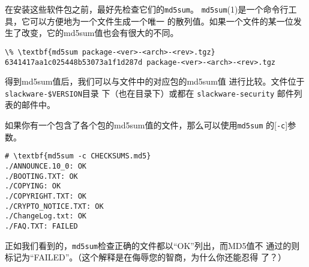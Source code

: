 在安装这些软件包之前，最好先检查它们的\texttt{md5sum}。
\texttt{md5sum}(1)是一个命令行工具，它可以方便地为一个文件生成一个唯一
的散列值。如果一个文件的某一位发生了改变，它的md5sum值也会有很大的不同。
\begin{Verbatim}[frame=single, commandchars=\\\{\}]
\% \textbf{md5sum package-<ver>-<arch>-<rev>.tgz}
6341417aa1c025448b53073a1f1d287d package-<ver>-<arch>-<rev>.tgz
\end{Verbatim}

得到md5sum值后，我们可以与文件中的对应包的md5sum值
进行比较。文件位于\texttt{slackware-\$VERSION}目录
下（也在目录下）或都在 \texttt{slackware-security} 邮件列
表的邮件中。

如果你有一个包含了各个包的md5sum值的文件，那么可以使用\texttt{md5sum}
的[\texttt{-c}]参数。
\begin{Verbatim}[frame=single, commandchars=\\\{\}]
# \textbf{md5sum -c CHECKSUMS.md5}
./ANNOUNCE.10_0: OK
./BOOTING.TXT: OK
./COPYING: OK
./COPYRIGHT.TXT: OK
./CRYPTO_NOTICE.TXT: OK
./ChangeLog.txt: OK
./FAQ.TXT: FAILED
\end{Verbatim}

正如我们看到的，\texttt{md5sum}检查正确的文件都以``OK''列出，而MD5值不
通过的则标记为``FAILED''。（这个解释是在侮辱您的智商，为什么你还能忍得
了？）




